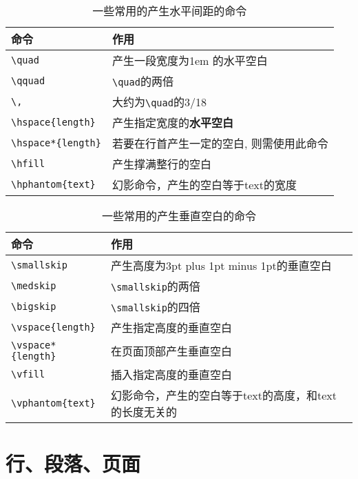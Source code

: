 \begin{table}
    \centering
    \caption{一些常用的产生水平间距的命令}
    \begin{tabular}{ll}
        \toprule
        命令 & 作用\\
        \midrule
        \verb|\quad| & 产生一段宽度为1em 的水平空白\\
        \verb|\qquad| & \verb|\quad|的两倍\\
        \verb|\,| & 大约为\verb|\quad|的3/18\\
        \verb|\hspace{length}| & 产生指定宽度的\textbf{水平空白}\\
        \verb|\hspace*{length}| & 若要在行首产生一定的空白, 则需使用此命令\\
        \verb|\hfill| & 产生撑满整行的空白\\
        \verb|\hphantom{text}| & 幻影命令，产生的空白等于text的宽度\\
        \bottomrule
    \end{tabular}
\end{table}

\begin{table}
    \centering
    \caption{一些常用的产生垂直空白的命令}
\begin{tabular}{ll}
    \toprule
    命令 & 作用\\
    \midrule
    \verb|\smallskip| & 产生高度为3pt plus 1pt minus 1pt的垂直空白\\
    \verb|\medskip| & \verb|\smallskip|的两倍\\
    \verb|\bigskip| & \verb|\smallskip|的四倍\\
    \verb|\vspace{length}| & 产生指定高度的垂直空白\\
    \verb|\vspace*{length}| & 在页面顶部产生垂直空白\\
    \verb|\vfill| & 插入指定高度的垂直空白\\
    \verb|\vphantom{text}| & 幻影命令，产生的空白等于text的高度，和text的长度无关的\\
    \bottomrule
\end{tabular}
\end{table}

\section{行、段落、页面}

